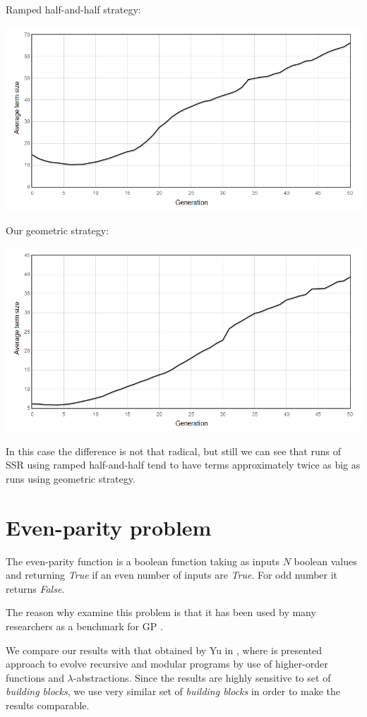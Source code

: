 \documentclass[12pt,a4paper]{report}
\begin{document}
Ramped half-and-half strategy:

\includegraphics[scale=0.65]{reports/SSR/term-sizes-SSR-10behu-ramped.png}

Our geometric strategy:

\includegraphics[scale=0.65]{reports/SSR/term-sizes-SSR-10behu-geom.png}

In this case the difference is not that radical, but still we can see
that runs of SSR using ramped half-and-half tend to have terms approximately twice
as big as runs using geometric strategy.

\newpage	
\section{Even-parity problem}
The even-parity function is a boolean function taking as inputs $N$
boolean values and returning \textit{True} if an even number of inputs 
are \textit{True}. For odd number it returns \textit{False}.

The reason why examine this problem is that it has been used by many researchers
as a benchmark for GP \cite{todo,yu01}.

We compare our results with that obtained by Yu in \cite{yu01},
where is presented approach to evolve recursive and modular programs
by use of higher-order functions and $\lambda$-abstractions.
Since the results are highly sensitive to set of \textit{building blocks}, 
we use very similar set of \textit{building blocks} in order to make 
the results comparable. 
\end{document}
